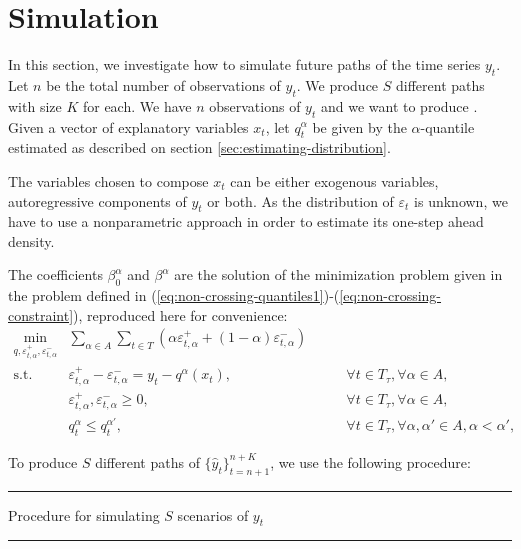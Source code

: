 \section{Simulation}
\label{sec:simulation}

In this section, we investigate how to simulate future paths of the time series $y_t$. 
Let $n$ be the total number of observations of $y_t$. We produce $S$ different paths with size $K$ for each. 
We have $n$ observations of $y_t$ and we want to produce . Given a vector of explanatory variables $x_t$, let $q_t^\alpha$ be given by the $\alpha$-quantile estimated as described on section \ref{sec:estimating-distribution}.

The variables chosen to compose $x_t$ can be either exogenous variables, autoregressive components of $y_t$ or both. As the distribution of $\varepsilon_t$ is unknown, we have to use a nonparametric approach in order to estimate its one-step ahead density.

The coefficients $\beta_0^\alpha$ and $\beta^\alpha$ are the solution of the minimization problem given in the problem defined in (\ref{eq:non-crossing-quantiles1})-(\ref{eq:non-crossing-constraint}), reproduced here for convenience:
\begin{eqnarray}
\label{eq:non-crossing-quantiles1-sim}
\min_{q,\varepsilon_{t,\alpha}^{+}, \varepsilon_{t,\alpha}^{-}} &  \sum_{\alpha \in A} \sum_{t \in T}\left(\alpha \varepsilon_{t,\alpha}^{+}+(1-\alpha)\varepsilon_{t,\alpha}^{-}\right) &  \\
\mbox{s.t. } & \varepsilon_{t,\alpha}^{+}-\varepsilon_{t,\alpha}^{-}=y_{t}-q^\alpha(x_{t}), & \qquad\forall t \in T_\tau,\forall \alpha \in A,\\
& \varepsilon_{t,\alpha}^+,\varepsilon_{t,\alpha}^- \geq 0, & \qquad\forall t \in T_\tau,\forall \alpha \in A,\\\label{eq:non-crossing-constraint-sim}
& q_t^{\alpha} \leq q_t^{\alpha'}, & \qquad \forall t \in T_\tau, \forall \alpha, \alpha' \in A, \alpha < \alpha', 
\end{eqnarray}

To produce $S$ different paths of $\{ \hat{y}_t \}_{t=n+1}^{n+K}$, we use the following procedure:

\noindent\rule{\textwidth}{3pt}

Procedure for simulating $S$ scenarios of $y_t$

\noindent\rule{\textwidth}{1pt}

